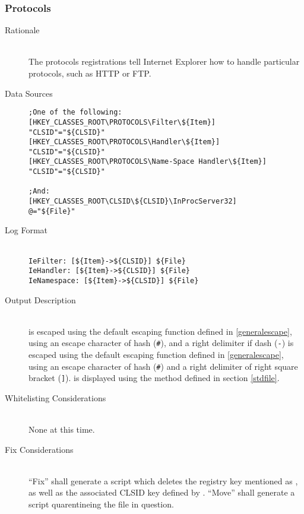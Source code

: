 \subsubsection{Protocols}
\begin{description}
\item[Rationale] \hfill \\
The protocols registrations tell Internet Explorer how to handle particular
protocols, such as HTTP or FTP.
\item[Data Sources] \hfill
\vspace{-\baselineskip}
\begin{verbatim}
;One of the following:
[HKEY_CLASSES_ROOT\PROTOCOLS\Filter\${Item}]
"CLSID"="${CLSID}"
[HKEY_CLASSES_ROOT\PROTOCOLS\Handler\${Item}]
"CLSID"="${CLSID}"
[HKEY_CLASSES_ROOT\PROTOCOLS\Name-Space Handler\${Item}]
"CLSID"="${CLSID}"

;And:
[HKEY_CLASSES_ROOT\CLSID\${CLSID}\InProcServer32]
@="${File}"
\end{verbatim}
\item[Log Format] \hfill \\
\verb|IeFilter: [${Item}->${CLSID}] ${File}| \\
\verb|IeHandler: [${Item}->${CLSID}] ${File}| \\
\verb|IeNamespace: [${Item}->${CLSID}] ${File}|
\item[Output Description] \hfill \\
 is escaped using the default escaping function defined in
\ref{generalescape}, using an escape character of hash (\verb|#|), and a right
delimiter if dash (\verb|-|)  is escaped using the default escaping
function defined in \ref{generalescape}, using an escape character of hash
(\verb|#|) and a right delimiter of right square bracket (\verb|]|).
 is displayed using the method defined in section \ref{stdfile}.
\item[Whitelisting Considerations] \hfill \\
None at this time.
\item[Fix Considerations] \hfill \\
``Fix'' shall generate a script which deletes the registry key mentioned as
, as well as the associated CLSID key defined by . ``Move''
shall generate a script quarentineing the file in question.
\end{description}

